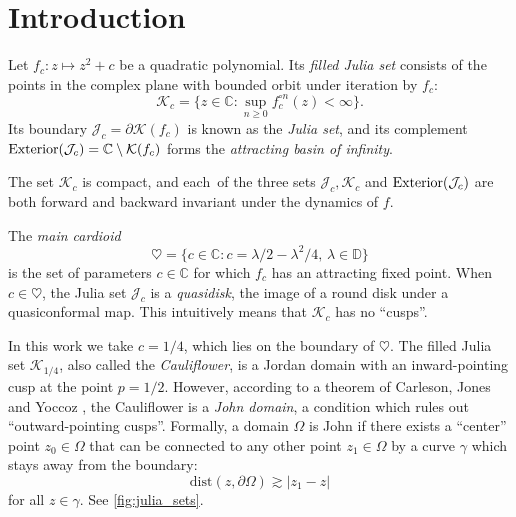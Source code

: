 

\usepackage{subcaption}



\section{Introduction}

% 

Let $f_c: z\mapsto z^2 + c$ be a quadratic polynomial. Its {\em filled Julia set} consists of the points in the complex plane with bounded orbit
under iteration by $f_c$:
$$
\mathcal K_c = \{z \in \mathbb{C} : \sup_{n \ge 0} f_c^{\circ n}(z) < \infty \}.
$$
Its boundary $\mathcal J_c = \partial \mathcal K(f_c)$ is known as the {\em Julia set}, and its complement $\operatorname{Exterior}(\mathcal{J}_c) = \mathbb{C} \setminus \mathcal K(f_c)$ forms the {\em attracting basin of infinity}. 

The set $\mathcal K_c$ is compact, and each\
  of the three sets
$\mathcal J_c, \mathcal K_c$ and $\operatorname{Exterior}(\mathcal{J}_c)$ are both forward and backward invariant under the dynamics of $f$.
 
The {\em main cardioid}
$$
\heartsuit = \bigl  \{c \in \mathbb{C}: c = \lambda/2 - \lambda^2/4,\, \lambda \in \mathbb{D} \bigr \}
$$
is the set of parameters $c \in \mathbb{C}$ for which $f_c$ has an attracting fixed point.
When $c \in \heartsuit$, the Julia set $\mathcal J_c$ is a \emph{quasidisk}, the image of a round disk under a quasiconformal map.
This intuitively means that $\mathcal K_c$ has no \enquote{cusps}.


In this work we take $c=1/4$, which lies on the boundary of $\heartsuit$. 
The filled Julia set $\mathcal K_{1/4}$, also called the \emph{Cauliflower}, 
is a Jordan domain with an inward-pointing cusp at the point $p=1/2$. However, according to a theorem of Carleson, Jones and Yoccoz \cite[Theorem 6.1]{carleson_julia_1994}, 
the Cauliflower is a \emph{John domain}, a condition which rules out \enquote{outward-pointing cusps}. 
Formally, a domain $\Omega$ is John if there exists a \enquote{center} point 
$z_0 \in \Omega$ that can be connected 
to any other point $z_1\in \Omega$ by a curve $\gamma$ which stays away from the boundary:
\begin{equation}
	\mathrm{dist}(z, \partial \Omega) \gtrsim |z_1-z|
\end{equation} for all $z\in \gamma$.
 See \cref{fig:julia_sets}.

